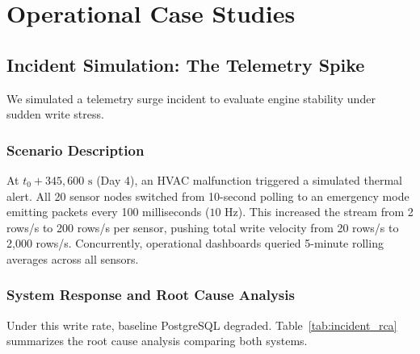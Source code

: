 \documentclass[conference,a4paper]{IEEEtran}
\begin{document}
\section{Operational Case Studies}

\subsection{Incident Simulation: The Telemetry Spike}
We simulated a telemetry surge incident to evaluate engine stability under sudden write stress.

\subsubsection{Scenario Description}
At $t_0 + 345{,}600\text{ s}$ (Day 4), an HVAC malfunction triggered a simulated thermal alert. All 20 sensor nodes switched from 10-second polling to an emergency mode emitting packets every 100 milliseconds ($10\text{ Hz}$). This increased the stream from 2 rows/s to 200 rows/s per sensor, pushing total write velocity from 20 rows/s to 2,000 rows/s. Concurrently, operational dashboards queried 5-minute rolling averages across all sensors.

\subsubsection{System Response and Root Cause Analysis}
Under this write rate, baseline PostgreSQL degraded. Table~\ref{tab:incident_rca} summarizes the root cause analysis comparing both systems.
\end{document}
